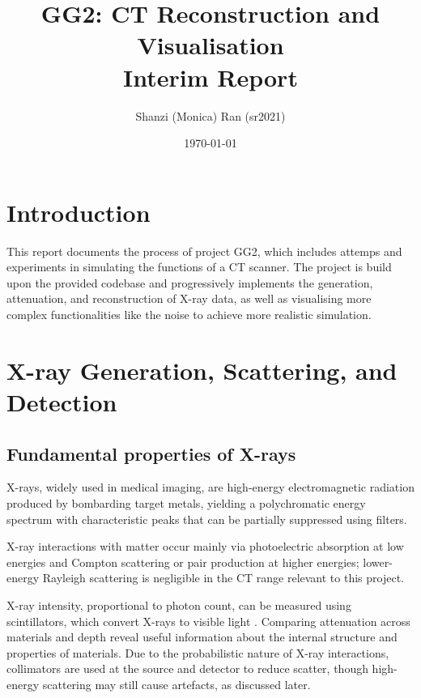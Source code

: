 \documentclass[10pt,twocolumn]{article}
\begin{document}
\title{\vspace{-2cm}\bfseries \Large GG2: CT Reconstruction and Visualisation\\[0.5em] \normalsize Interim Report}
\author{\small Shanzi (Monica) Ran (sr2021)\\}
\date{\small \today}
\maketitle

\section{Introduction}
This report documents the process of project GG2, which includes attemps and experiments in simulating the functions of a CT scanner. The project is build upon the provided codebase and progressively implements the generation, attenuation, and reconstruction of X-ray data, as well as visualising more complex functionalities like the noise to achieve more realistic simulation.

\section{X-ray Generation, Scattering, and Detection}
\subsection{Fundamental properties of X-rays}
X-rays, widely used in medical imaging, are high-energy electromagnetic radiation produced by bombarding target metals, yielding a polychromatic energy spectrum with characteristic peaks that can be partially suppressed using filters.

X-ray interactions with matter occur mainly via photoelectric absorption at low energies and Compton scattering or pair production at higher energies; lower-energy Rayleigh scattering is negligible in the CT range relevant to this project.

X-ray intensity, proportional to photon count, can be measured using scintillators, which convert X-rays to visible light \cite{KRAMAR19992467}. Comparing attenuation across materials and depth reveal useful information about the internal structure and properties of materials. Due to the probabilistic nature of X-ray interactions, collimators are used at the source and detector to reduce scatter, though high-energy scattering may still cause artefacts, as discussed later.
\end{document}
